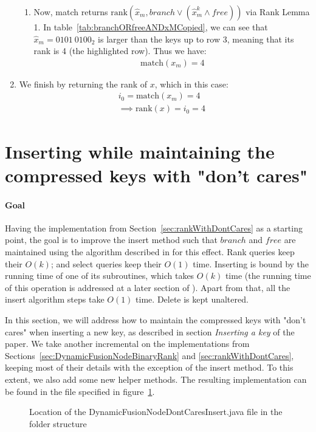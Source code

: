 \begin{enumerate}
\begin{enumerate}
        \item
        Now, match returns $\text{rank}(\hat x_m, branch \vee (\hat x^k_m \wedge free))$ via Rank Lemma 1. In table~\ref{tab:branchORfreeANDxMCopied}, we can see that $\hat x_m = 0101\ 0100_2$ is larger than the keys up to row 3, meaning that its rank is 4 (the highlighted row). Thus we have:
        \begin{align*}
            \text{match}(x_m) = 4
        \end{align*}
    \end{enumerate}
    
    \item
    We finish by returning the rank of $x$, which in this case:
    \begin{align*}
        i_0 = \text{match}(x_m) = 4& \\
        \implies \text{rank}(x) = i_0 = 4&
    \end{align*}
\end{enumerate}

\newpage
\section{Inserting while maintaining the compressed keys with "don't cares"} \label{sec:InsertDontCares}

\paragraph*{Goal}
Having the implementation from Section~\ref{sec:rankWithDontCares} as a starting point, the goal is to improve the insert method such that $branch$ and $free$ are maintained using the algorithm described in \cite{patrascu2014dynamic} for this effect. Rank queries keep their $O(k)$; and select queries keep their $O(1)$ time. Inserting is bound by the running time of one of its subroutines, which takes $O(k)$ time (the running time of this operation is addressed at a later section of \cite{patrascu2014dynamic}). Apart from that, all the insert algorithm steps take $O(1)$ time. Delete is kept unaltered.

In this section, we will address how to maintain the compressed keys with "don't cares" when inserting a new key, as described in section \textit{Inserting a key} of the \cite{patrascu2014dynamic} paper.
We take another incremental on the implementations from Sections~\ref{sec:DynamicFusionNodeBinaryRank} and \ref{sec:rankWithDontCares}, keeping most of their details with the exception of the {\ttfamily insert} method.
To this extent, we also add some new helper methods.
The resulting implementation can be found in the file specified in figure~\ref{fig:DynamicFusionNodeDontCaresInsertTree}.
\begin{figure}[H]
\caption{Location of the {\ttfamily DynamicFusionNodeDontCaresInsert.java} file in the folder structure}
\label{fig:DynamicFusionNodeDontCaresInsertTree}
\end{figure}

